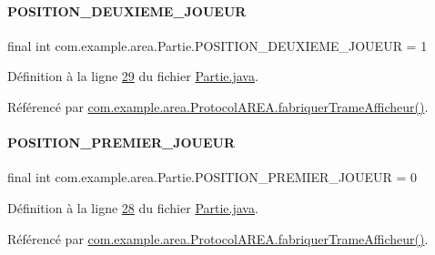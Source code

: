 \paragraph{\texorpdfstring{P\+O\+S\+I\+T\+I\+O\+N\+\_\+\+D\+E\+U\+X\+I\+E\+M\+E\+\_\+\+J\+O\+U\+E\+UR}{POSITION\_DEUXIEME\_JOUEUR}}
{\footnotesize\ttfamily final int com.\+example.\+area.\+Partie.\+P\+O\+S\+I\+T\+I\+O\+N\+\_\+\+D\+E\+U\+X\+I\+E\+M\+E\+\_\+\+J\+O\+U\+E\+UR = 1\hspace{0.3cm}{\ttfamily [static]}}



Définition à la ligne \hyperlink{_partie_8java_source_l00029}{29} du fichier \hyperlink{_partie_8java_source}{Partie.\+java}.



Référencé par \hyperlink{_protocol_a_r_e_a_8java_source_l00048}{com.\+example.\+area.\+Protocol\+A\+R\+E\+A.\+fabriquer\+Trame\+Afficheur()}.

\mbox{\label{classcom_1_1example_1_1area_1_1_partie_a2f977d38424ff199a053d9e3cd4eb8c6}} 
\paragraph{\texorpdfstring{P\+O\+S\+I\+T\+I\+O\+N\+\_\+\+P\+R\+E\+M\+I\+E\+R\+\_\+\+J\+O\+U\+E\+UR}{POSITION\_PREMIER\_JOUEUR}}
{\footnotesize\ttfamily final int com.\+example.\+area.\+Partie.\+P\+O\+S\+I\+T\+I\+O\+N\+\_\+\+P\+R\+E\+M\+I\+E\+R\+\_\+\+J\+O\+U\+E\+UR = 0\hspace{0.3cm}{\ttfamily [static]}}



Définition à la ligne \hyperlink{_partie_8java_source_l00028}{28} du fichier \hyperlink{_partie_8java_source}{Partie.\+java}.



Référencé par \hyperlink{_protocol_a_r_e_a_8java_source_l00048}{com.\+example.\+area.\+Protocol\+A\+R\+E\+A.\+fabriquer\+Trame\+Afficheur()}.

\mbox{\label{classcom_1_1example_1_1area_1_1_partie_ac0444402f7c570474df1c8b7ece88ad9}} 
